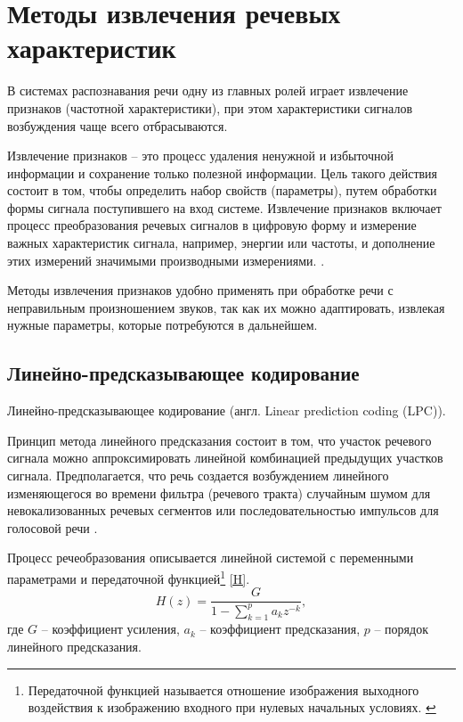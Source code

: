 \section{Методы извлечения речевых характеристик}
В системах распознавания речи одну из главных ролей играет извлечение признаков (частотной характеристики), при этом характеристики сигналов возбуждения чаще всего отбрасываются. 

Извлечение признаков -- это процесс удаления ненужной и избыточной информации и сохранение только полезной информации. Цель такого действия состоит в том, чтобы определить набор свойств (параметры), путем обработки формы сигнала поступившего на вход системе.  Извлечение признаков включает процесс преобразования речевых сигналов в цифровую форму и измерение важных характеристик сигнала, например, энергии или частоты, и дополнение этих измерений значимыми производными измерениями. \cite{isvparam1} \cite{isvparam2}.

Методы извлечения признаков удобно применять при обработке речи с неправильным произношением звуков, так как их можно адаптировать, извлекая нужные параметры, которые потребуются в дальнейшем.

\subsection{Линейно-предсказывающее кодирование}
Линейно-предсказывающее кодирование (англ. Linear prediction coding \newpage(LPC)).


Принцип метода линейного предсказания состоит в том, что участок речевого сигнала можно аппроксимировать линейной комбинацией предыдущих участков сигнала. Предполагается, что речь создается возбуждением линейного изменяющегося во времени фильтра (речевого тракта) случайным шумом для невокализованных речевых сегментов или последовательностью импульсов для голосовой речи \cite{methodisb}.

Процесс речеобразования описывается линейной системой с переменными параметрами и передаточной функцией\footnote{Передаточной функцией называется отношение изображения выходного воздействия к изображению входного при нулевых начальных условиях. \cite{peredfunc}} \eqref{H}.
\begin{equation}
\label{H}
H(z) = \frac{G}{1 - \sum_{k = 1}^{p} a_k z^{-k}},
\end{equation}
где $G$ -- коэффициент усиления, $a_k$ -- коэффициент предсказания, $p$ -- порядок линейного предсказания.

